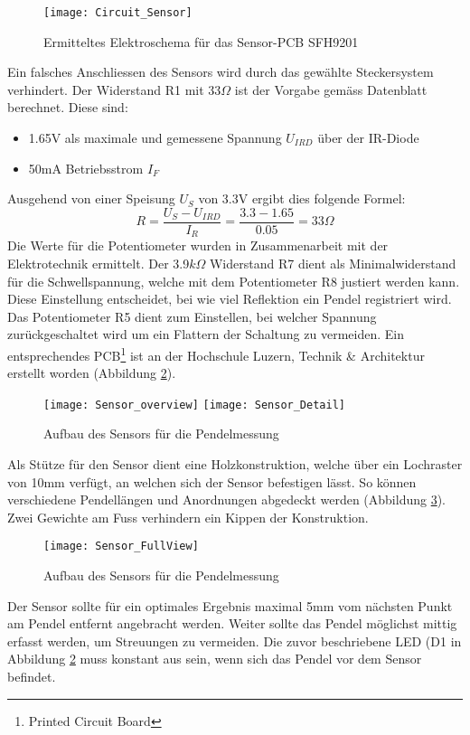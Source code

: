 	\begin{figure}[H]
		\centering
		\texttt{[image: Circuit\_Sensor]}
		\caption{Ermitteltes Elektroschema für das Sensor-PCB SFH9201}
		\label{fig:schema_sensor}
	\end{figure}
	\noindent Ein falsches Anschliessen des Sensors wird durch das gewählte Steckersystem verhindert. Der Widerstand R1 mit 33$\Omega$ ist der Vorgabe gemäss Datenblatt berechnet. Diese sind:
	\begin{itemize}
		\item 1.65V als maximale und gemessene Spannung $U_{IRD}$ über der IR-Diode
		\item 50mA Betriebsstrom $I_F$
	\end{itemize}
	Ausgehend von einer Speisung $U_S$ von 3.3V ergibt dies folgende Formel:
	\[
		R = \frac{U_S - U_{IRD}}{I_R} = \frac{3.3 - 1.65}{0.05} = 33\Omega
	\]
	Die Werte für die Potentiometer wurden in Zusammenarbeit mit der Elektrotechnik ermittelt. Der 3.9$k\Omega$ Widerstand R7 dient als Minimalwiderstand für die Schwellspannung, welche mit dem Potentiometer R8 justiert werden kann. Diese Einstellung entscheidet, bei wie viel Reflektion ein Pendel registriert wird.
Das Potentiometer R5 dient zum Einstellen, bei welcher Spannung zurückgeschaltet wird um ein Flattern der Schaltung zu vermeiden.
Ein entsprechendes PCB\footnote{Printed Circuit Board} ist an der Hochschule Luzern, Technik \& Architektur erstellt worden (Abbildung \ref{fig:Sensor_overview}).\\
	\begin{figure}[H]
		\centering
		\texttt{[image: Sensor\_overview]}
		\texttt{[image: Sensor\_Detail]}
		\caption{Aufbau des Sensors für die Pendelmessung}
		\label{fig:Sensor_overview}
	\end{figure}
	\noindent Als Stütze für den Sensor dient eine Holzkonstruktion, welche über ein Lochraster von 10mm verfügt, an welchen sich der Sensor befestigen lässt. So können verschiedene Pendellängen und Anordnungen abgedeckt werden (Abbildung \ref{fig:Sensor_FullView}). Zwei Gewichte am Fuss verhindern ein Kippen der Konstruktion.
	\begin{figure}[H]
		\centering
		\texttt{[image: Sensor\_FullView]}
		\caption{Aufbau des Sensors für die Pendelmessung}
		\label{fig:Sensor_FullView}
	\end{figure}
	\noindent Der Sensor sollte für ein optimales Ergebnis maximal 5mm vom nächsten Punkt am Pendel entfernt angebracht werden. Weiter sollte das Pendel möglichst mittig erfasst werden, um Streuungen zu vermeiden. Die zuvor beschriebene LED (D1 in Abbildung \ref{fig:Sensor_overview} muss konstant aus sein, wenn sich das Pendel vor dem Sensor befindet. 
